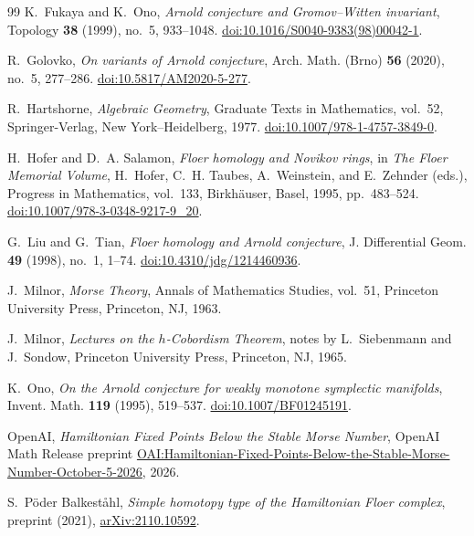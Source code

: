 \begin{thebibliography}{99}
K.~Fukaya and K.~Ono,
\emph{Arnold conjecture and Gromov--Witten invariant},
Topology \textbf{38} (1999), no.~5, 933--1048.
\href{https://doi.org/10.1016/S0040-9383(98)00042-1}{doi:10.1016/S0040-9383(98)00042-1}.

R.~Golovko,
\emph{On variants of Arnold conjecture},
Arch. Math. (Brno) \textbf{56} (2020), no.~5, 277--286.
\href{https://doi.org/10.5817/AM2020-5-277}{doi:10.5817/AM2020-5-277}.

R.~Hartshorne,
\emph{Algebraic Geometry},
Graduate Texts in Mathematics, vol.~52,
Springer-Verlag, New York--Heidelberg, 1977.
\href{https://doi.org/10.1007/978-1-4757-3849-0}{doi:10.1007/978-1-4757-3849-0}.

H.~Hofer and D.~A. Salamon,
\emph{Floer homology and Novikov rings},
in \emph{The Floer Memorial Volume},
H.~Hofer, C.~H. Taubes, A.~Weinstein, and E.~Zehnder (eds.),
Progress in Mathematics, vol.~133,
Birkh\"auser, Basel, 1995, pp.~483--524.
\href{https://doi.org/10.1007/978-3-0348-9217-9_20}{doi:10.1007/978-3-0348-9217-9\_20}.

G.~Liu and G.~Tian,
\emph{Floer homology and Arnold conjecture},
J. Differential Geom. \textbf{49} (1998), no.~1, 1--74.
\href{https://doi.org/10.4310/jdg/1214460936}{doi:10.4310/jdg/1214460936}.

J.~Milnor,
\emph{Morse Theory},
Annals of Mathematics Studies, vol.~51,
Princeton University Press, Princeton, NJ, 1963.

J.~Milnor,
\emph{Lectures on the $h$-Cobordism Theorem},
notes by L.~Siebenmann and J.~Sondow,
Princeton University Press, Princeton, NJ, 1965.

K.~Ono,
\emph{On the Arnold conjecture for weakly monotone symplectic manifolds},
Invent. Math. \textbf{119} (1995), 519--537.
\href{https://doi.org/10.1007/BF01245191}{doi:10.1007/BF01245191}.

OpenAI,
\emph{Hamiltonian Fixed Points Below the Stable Morse Number},
OpenAI Math Release preprint
\href{https://github.com/openai/math/blob/main/preprints/Hamiltonian-Fixed-Points-Below-the-Stable-Morse-Number-October-5-2026/paper.pdf}{OAI:Hamiltonian-Fixed-Points-Below-the-Stable-Morse-Number-October-5-2026},
2026.

S.~P\"oder Balkest\aa hl,
\emph{Simple homotopy type of the Hamiltonian Floer complex},
preprint (2021), \href{https://arxiv.org/abs/2110.10592}{arXiv:2110.10592}.


\end{thebibliography}
